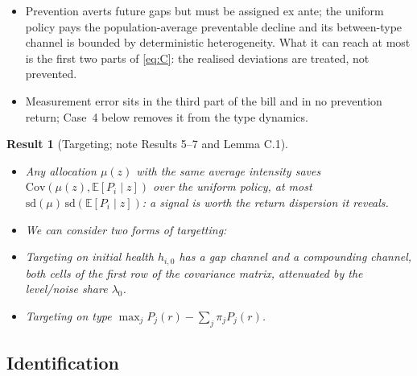 \documentclass[11pt]{article}
\newtheorem{result}{Result}
\newcommand{\E}{\mathbb{E}}
\newcommand{\Cov}{\mathrm{Cov}}
\begin{document}
\begin{itemize}
		\begin{equation}
			\begin{aligned}
				S_j(r;\mu)&\equiv\sum_{a\ge r}\E\bigl[c(h_{i,a})-c(h_{i,a}+\mu d_{j,a})\bigm| j\bigr]\\
				&=\mu P_j(r)-\frac{\mu^2}{2}\sum_{a\ge r}c''\bigl(\E[h_{i,a}\mid j]\bigr)\,d_{j,a}^2-\frac{\mu^3}{6}\,c'''\sum_{a\ge r}d_{j,a}^3,
			\end{aligned}
			\label{eq:Sexact}
		\end{equation}
		since $c''$ is linear and $c'''$ a constant. Section~\ref{sec:policy} reports $S(r)\equiv\sum_j\pi_jS_j(r;1)$, the saving from holding back the whole decline, beside $P(r)$; unlike $P(r)$, it cannot exceed the bill.
		\item Prevention averts future gaps but must be assigned ex ante; the uniform policy pays the population-average preventable decline and its between-type channel is bounded by deterministic heterogeneity. What it can reach at most is the first two parts of \eqref{eq:C}: the realised deviations are treated, not prevented.
		\item Measurement error sits in the third part of the bill and in no prevention return; Case~4 below removes it from the type dynamics.
	\end{itemize}
	
	
	\begin{result}[Targeting; note Results 5--7 and Lemma C.1]\label{res:target}~\\
		\begin{itemize}
			\item Any allocation $\mu(z)$ with the same average intensity saves $\Cov(\mu(z),\E[P_i\mid z])$ over the uniform policy, at most $\mathrm{sd}(\mu)\,\mathrm{sd}(\E[P_i\mid z])$: a signal is worth the return dispersion it reveals. 
			\item We can consider two forms of targetting:
			\item Targeting on initial health $h_{i,0}$ has a gap channel and a compounding channel, both cells of the first row of the covariance matrix, attenuated by the level/noise share $\lambda_0$.
			\item Targeting on type $\max_jP_j(r)-\sum_j\pi_jP_j(r)$.
		\end{itemize} 
	\end{result}
	
	\subsection{Identification}
	\label{sec:ident_fw}
	
\end{document}
